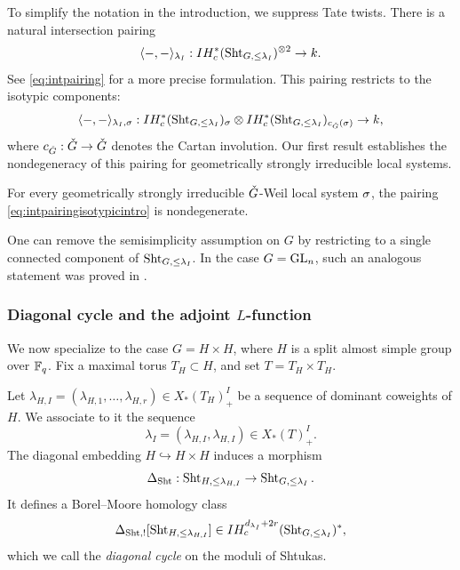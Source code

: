 \documentclass[reqno]{amsart}
\numberwithin{equation}{section}
\numberwithin{equation}{section}
\begin{document}
To simplify the notation in the introduction, we suppress Tate twists. There is a natural intersection pairing
\begin{equation}\label{eq:intpairingintro}
    \langle -, - \rangle_{\lambda_I} :
    IH_c^*(\operatorname{Sht}_{G,\leq\lambda_I})^{\otimes 2}
    \to k.
\end{equation}
See \eqref{eq:intpairing} for a more precise formulation. This pairing restricts to the isotypic components:
\begin{equation}\label{eq:intpairingisotypicintro}
    \langle -, - \rangle_{\lambda_I,\sigma} :
    IH_c^*(\operatorname{Sht}_{G,\leq\lambda_I})_{\sigma}
    \otimes
    IH_c^*(\operatorname{Sht}_{G,\leq\lambda_I})_{c_{\check{G}}(\sigma)}
    \to k,
\end{equation}
where $c_{\check{G}}:\check{G}\to\check{G}$ denotes the Cartan involution. Our first result establishes the nondegeneracy of this pairing for geometrically strongly irreducible local systems.

\begin{thm}\label{thm:intnondegintro}
    For every geometrically strongly irreducible $\check{G}$-Weil local system $\sigma$, the pairing \eqref{eq:intpairingisotypicintro} is nondegenerate.
\end{thm}

\begin{remark}
    One can remove the semisimplicity assumption on $G$ by restricting to a single connected component of $\operatorname{Sht}_{G,\leq\lambda_I}$. In the case $G=\operatorname{GL}_n$, such an analogous statement was proved in \cite[Corollary~6.13]{wang2025specialcycleshtukascategorical}.
\end{remark}


\subsubsection{Diagonal cycle and the adjoint $L$-function}

We now specialize to the case $G=H\times H$, where $H$ is a split almost simple group over $\mathbb{F}_q$. Fix a maximal torus $T_H\subset H$, and set $T=T_H\times T_H$.

Let $\lambda_{H,I}=(\lambda_{H,1},\dots,\lambda_{H,r})\in X_*(T_H)^I_+$ be a sequence of dominant coweights of $H$. We associate to it the sequence
\[
\lambda_I=(\lambda_{H,I},\lambda_{H,I})\in X_*(T)^I_+.
\]
The diagonal embedding $H\hookrightarrow H\times H$ induces a morphism
\begin{equation}
    \Delta_{\operatorname{Sht}}:\operatorname{Sht}_{H,\leq\lambda_{H,I}}
    \to
    \operatorname{Sht}_{G,\leq\lambda_I}.
\end{equation}
It defines a Borel--Moore homology class
\begin{equation}
    \Delta_{\operatorname{Sht},!}[\operatorname{Sht}_{H,\leq\lambda_{H,I}}]
    \in
    IH_c^{d_{\lambda_I}+2r}(\operatorname{Sht}_{G,\leq\lambda_I})^*,
\end{equation}
which we call the \emph{diagonal cycle} on the moduli of Shtukas.
\end{document}
